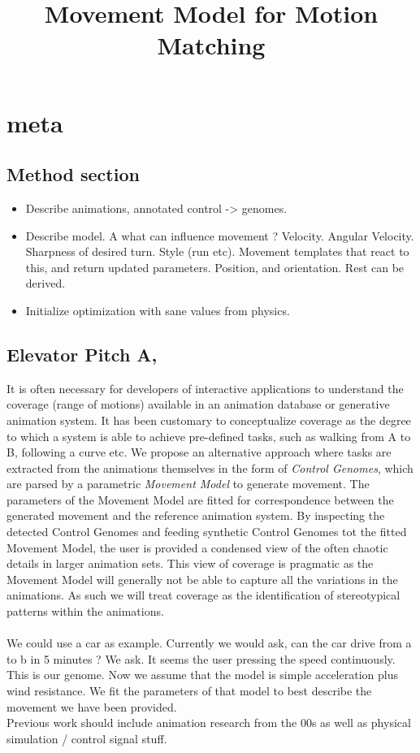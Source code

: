 \documentclass[format=acmtog]{acmart}
\begin{document}
\title{Movement Model for Motion Matching}









\maketitle

\section{meta}
\subsection{Method section}
\begin{itemize}
    \item Describe animations, annotated control -> genomes.
    \item Describe model. A what can influence movement ? Velocity. Angular Velocity. Sharpness of desired turn. Style (run etc). Movement templates that react to this, and return updated parameters. Position, and orientation. Rest can be derived.
    \item Initialize optimization with sane values from physics.
\end{itemize}

\subsection{Elevator Pitch A,}
It is often necessary for developers of interactive applications to understand the coverage (range of motions) available in an animation database or generative animation system. It has been customary to conceptualize coverage as the degree to which a system is able to achieve pre-defined tasks, such as walking from A to B, following a curve etc. We propose an alternative approach where tasks are extracted from the animations themselves in the form of \textit{Control Genomes}, which are parsed by a parametric \textit{Movement Model} to generate movement. The parameters of the Movement Model are fitted for correspondence between the generated movement and the reference animation system. By inspecting the detected Control Genomes and feeding synthetic Control Genomes tot the fitted Movement Model, the user is provided a condensed view of the often chaotic details in larger animation sets. This view of coverage is pragmatic as the Movement Model will generally not be able to capture all the variations in the animations. As such we will treat coverage as the identification of stereotypical patterns within the animations.      
\\\\ 
We could use a car as example. Currently we would ask, can the car drive from a to b in 5 minutes ? We ask. It seems the user pressing the speed continuously. This is our genome. Now we assume that the model is simple acceleration plus wind resistance. We fit the parameters of that model to best describe the movement we have been provided. \\ Previous work should include animation research from the 00s as well as physical simulation / control signal stuff.  
\end{document}
